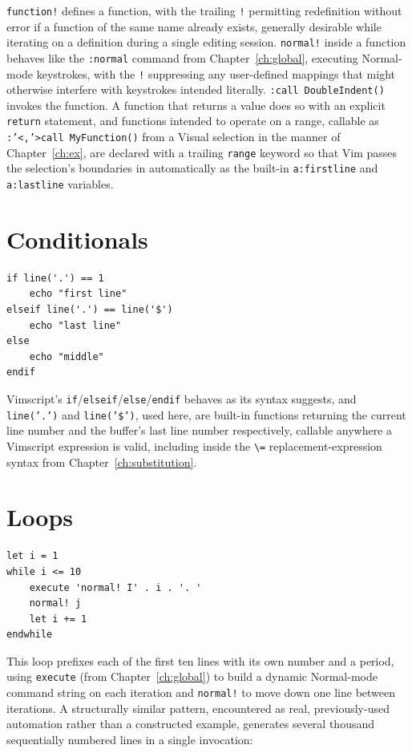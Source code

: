 \texttt{function!} defines a function, with the trailing \texttt{!} permitting redefinition without error if a function of the same name already exists, generally desirable while iterating on a definition during a single editing session. \texttt{normal!} inside a function behaves like the \texttt{:normal} command from Chapter~\ref{ch:global}, executing Normal-mode keystrokes, with the \texttt{!} suppressing any user-defined mappings that might otherwise interfere with keystrokes intended literally. \texttt{:call DoubleIndent()} invokes the function. A function that returns a value does so with an explicit \texttt{return} statement, and functions intended to operate on a range, callable as \texttt{:'<,'>call MyFunction()} from a Visual selection in the manner of Chapter~\ref{ch:ex}, are declared with a trailing \texttt{range} keyword so that Vim passes the selection's boundaries in automatically as the built-in \texttt{a:firstline} and \texttt{a:lastline} variables.

\section{Conditionals}

\begin{lstlisting}
if line('.') == 1
    echo "first line"
elseif line('.') == line('$')
    echo "last line"
else
    echo "middle"
endif
\end{lstlisting}

Vimscript's \texttt{if}/\texttt{elseif}/\texttt{else}/\texttt{endif} behaves as its syntax suggests, and \texttt{line('.')} and \texttt{line('\$')}, used here, are built-in functions returning the current line number and the buffer's last line number respectively, callable anywhere a Vimscript expression is valid, including inside the \texttt{\textbackslash=} replacement-expression syntax from Chapter~\ref{ch:substitution}.

\section{Loops}

\begin{lstlisting}
let i = 1
while i <= 10
    execute 'normal! I' . i . '. '
    normal! j
    let i += 1
endwhile
\end{lstlisting}

This loop prefixes each of the first ten lines with its own number and a period, using \texttt{execute} (from Chapter~\ref{ch:global}) to build a dynamic Normal-mode command string on each iteration and \texttt{normal!} to move down one line between iterations. A structurally similar pattern, encountered as real, previously-used automation rather than a constructed example, generates several thousand sequentially numbered lines in a single invocation:

